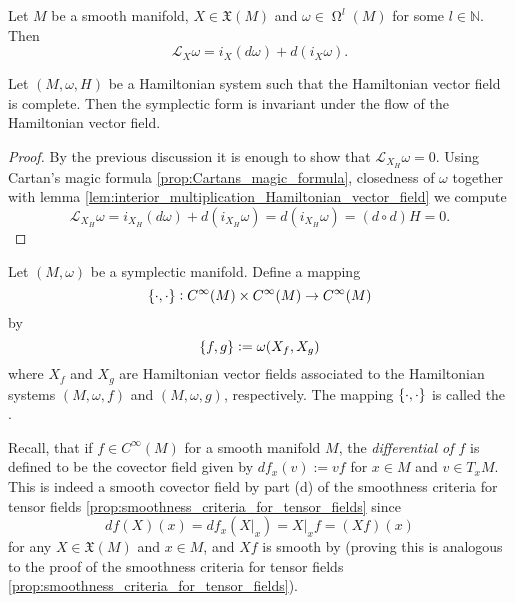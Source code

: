 \begin{proposition}
	\label{prop:Cartans_magic_formula}
	Let $M$ be a smooth manifold, $X \in \mathfrak{X}(M)$ and $\omega \in \upOmega^l(M)$ for some $l \in \mathbb{N}$. Then
	\begin{equation*}
		\mathcal{L}_X\omega = i_X(d\omega) + d(i_X\omega).
	\end{equation*}
\end{proposition}

\begin{proposition}
	Let $(M,\omega,H)$ be a Hamiltonian system such that the Hamiltonian vector field is complete. Then the symplectic form is invariant under the flow of the Hamiltonian vector field.
\end{proposition}

\begin{proof}
	By the previous discussion it is enough to show that $\mathcal{L}_{X_H}\omega = 0$. Using Cartan's magic formula \ref{prop:Cartans_magic_formula}, closedness of $\omega$ together with lemma \ref{lem:interior_multiplication_Hamiltonian_vector_field} we compute
	\begin{equation*}
		\mathcal{L}_{X_H}\omega = i_{X_H}(d\omega) + d(i_{X_H}\omega) = d(i_{X_H}\omega) = (d \circ d)H = 0.
	\end{equation*}
\end{proof}

\begin{definition}
	Let $(M,\omega)$ be a symplectic manifold. Define a mapping 
	\begin{equation*}
		\cbr{\cdot,\cdot} : C^\infty(M) \times C^\infty(M) \to C^\infty(M)
	\end{equation*}
	\noindent by
	\begin{equation*}
		\cbr{f,g} := \omega(X_f,X_g)
	\end{equation*}
	\noindent where $X_f$ and $X_g$ are Hamiltonian vector fields associated to the Hamiltonian systems $(M,\omega,f)$ and $(M,\omega,g)$, respectively. The mapping $\cbr{\cdot,\cdot}$ is called the .	
\end{definition}

Recall, that if $f \in C^\infty(M)$ for a smooth manifold $M$, the \emph{differential of $f$} is defined to be the covector field given by $df_x(v) := vf$ for $x \in M$ and $v \in T_xM$. This is indeed a smooth covector field by part (d) of the smoothness criteria for tensor fields \ref{prop:smoothness_criteria_for_tensor_fields} since
\begin{equation}
	\label{eq:differential_vector_field}
	df(X)(x) = df_x(X\vert_x) = X\vert_x f = (Xf)(x)
\end{equation}
\noindent for any $X \in \mathfrak{X}(M)$ and $x \in M$, and $Xf$ is smooth by \cite[180]{lee:smooth_manifolds:2013} (proving this is analogous to the proof of the smoothness criteria for tensor fields \ref{prop:smoothness_criteria_for_tensor_fields}).

